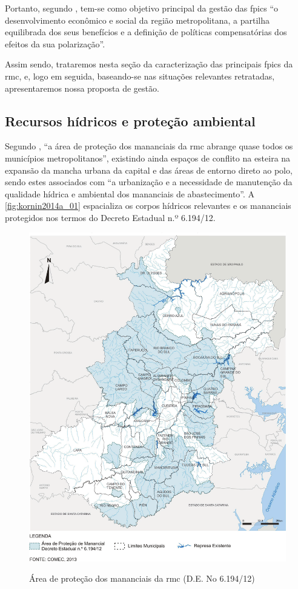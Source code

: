 	Portanto, segundo , tem-se como objetivo principal da gestão das \gls{fpic}s ``o desenvolvimento econômico e social da região metropolitana, a partilha equilibrada dos seus benefícios e a definição de políticas compensatórias dos efeitos da sua polarização''.
	
	Assim sendo, trataremos nesta seção da caracterização das principais \gls{fpic}s da \glsdesc{rmc}, e, logo em seguida, baseando-se nas situações relevantes retratadas, apresentaremos nossa proposta de gestão.
	
	\subsection{Recursos hídricos e proteção ambiental}
	
	Segundo , ``a área de proteção dos mananciais da \gls{rmc} abrange quase todos os municípios metropolitanos'', existindo ainda espaços de conflito na esteira na expansão da mancha urbana da capital e das áreas de entorno direto ao polo, sendo estes associados com ``a urbanização e a necessidade de manutenção da qualidade hídrica e ambiental dos mananciais de abastecimento''. A \autoref{fig:kornin2014a_01} espacializa os corpos hídricos relevantes e os mananciais protegidos nos termos do Decreto Estadual n.º 6.194/12.
	
	\begin{figure}
		\centering
		\caption{Área de proteção dos mananciais da \gls{rmc} (D.E. No 6.194/12)}
		\includegraphics[width=1.0\linewidth]{img/kornin2014a_01}
		\label{fig:kornin2014a_01}
	\end{figure}

